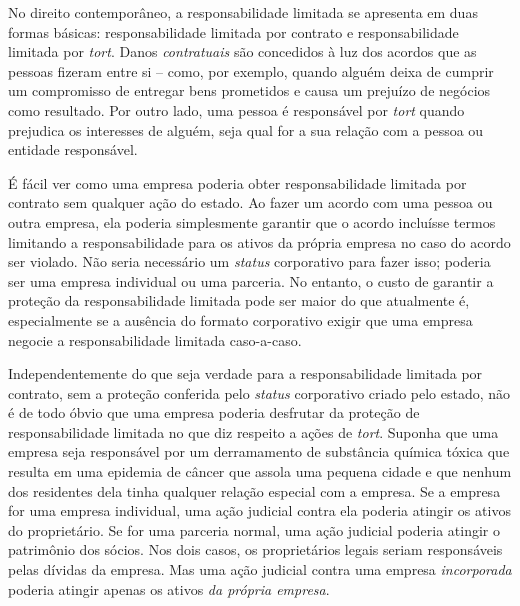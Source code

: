 No direito contemporâneo, a responsabilidade limitada se apresenta em duas formas básicas: responsabilidade limitada por contrato e responsabilidade limitada por \emph{tort}. Danos \emph{contratuais} são concedidos à luz dos acordos que as pessoas fizeram entre si -- como, por exemplo, quando alguém deixa de cumprir um compromisso de entregar bens prometidos e causa um prejuízo de negócios como resultado. Por outro lado, uma pessoa é responsável por \emph{tort} quando prejudica os interesses de alguém, seja qual for a sua relação com a pessoa ou entidade responsável.

É fácil ver como uma empresa poderia obter responsabilidade limitada por contrato sem qualquer ação do estado. Ao fazer um acordo com uma pessoa ou outra empresa, ela poderia simplesmente garantir que o acordo incluísse termos limitando a responsabilidade para os ativos da própria empresa no caso do acordo ser violado. Não seria necessário um \emph{status} corporativo para fazer isso; poderia ser uma empresa individual ou uma parceria. No entanto, o custo de garantir a proteção da responsabilidade limitada pode ser maior do que atualmente é, especialmente se a ausência do formato corporativo exigir que uma empresa negocie a responsabilidade limitada caso-a-caso.

Independentemente do que seja verdade para a responsabilidade limitada por contrato, sem a proteção conferida pelo \emph{status} corporativo criado pelo estado, não é de todo óbvio que uma empresa poderia desfrutar da proteção de responsabilidade limitada no que diz respeito a ações de \emph{tort}. Suponha que uma empresa seja responsável por um derramamento de substância química tóxica que resulta em uma epidemia de câncer que assola uma pequena cidade e que nenhum dos residentes dela tinha qualquer relação especial com a empresa. Se a empresa for uma empresa individual, uma ação judicial contra ela poderia atingir os ativos do proprietário. Se for uma parceria normal, uma ação judicial poderia atingir o patrimônio dos sócios. Nos dois casos, os proprietários legais seriam responsáveis pelas dívidas da empresa. Mas uma ação judicial contra uma empresa \emph{incorporada} poderia atingir apenas os ativos \emph{da própria empresa}.

